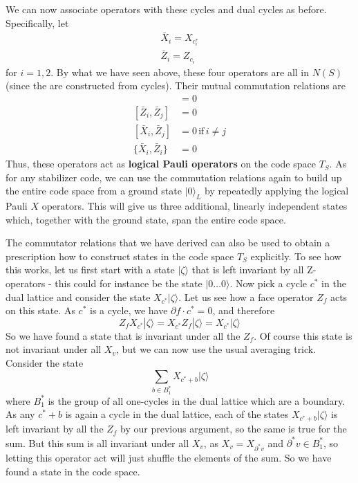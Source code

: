 \documentclass[a4paper, draft]{article}
\theoremstyle{own}
\theoremstyle{remark}
\begin{document}
We can now associate operators with these cycles and dual cycles as before. Specifically, let
\begin{align*}
\bar{X}_i = X_{c^*_i} \\
\bar{Z}_i = Z_{c_i} 
\end{align*}
for $i = 1,2$. By what we have seen above, these four operators are all in $N(S)$ (since the are constructed from cycles). Their mutual commutation relations are
\begin{align*}
[\bar{X}_i, \bar{X}_j] &= 0 \\
[\bar{Z}_i, \bar{Z}_j] &= 0 \\
[\bar{X}_i, \bar{Z}_j] &= 0 \, \text{if} \, i \neq j  \\
\{ \bar{X}_i, \bar{Z}_i \} &= 0 
\end{align*}
Thus, these operators act as {\bf logical Pauli operators} on the code space $T_S$. As for any stabilizer code, we can use the commutation relations again to build up the entire code space from a ground state $|0 \rangle_L$ by repeatedly applying the logical Pauli $X$ operators. This will give us three additional, linearly independent states which, together with the ground state, span the entire code space. 

The commutator relations that we have derived can also be used to obtain a prescription how to construct states in the code space $T_S$ explicitly. To see how this works, let us first start with a state $|\zeta \rangle$ that is left invariant by all Z-operators - this could for instance be the state $| 0 \dots 0 \rangle$. Now pick a cycle $c^*$ in the dual lattice and consider the state $X_{c^*} |\zeta \rangle$. Let us see how a face operator $Z_f$ acts on this state. As $c^*$ is a cycle, we have $\partial f \cdot c^* = 0$, and therefore
$$
Z_f X_{c^*} |\zeta \rangle = X_{c^*} Z_f |\zeta \rangle = X_{c^*} |\zeta \rangle
$$
So we have found a state that is invariant under all the $Z_f$. Of course this state is not invariant under all $X_v$, but we can now use the usual averaging trick. Consider the state
$$
\sum_{b \in B_1^*} X_{c^* + b} |\zeta \rangle
$$
where $B_1^*$ is the group of all one-cycles in the dual lattice which are a boundary. As any $c^* + b$ is again a cycle in the dual lattice, each of the states $X_{c^* + b} |\zeta \rangle$ is left invariant by all the $Z_f$ by our previous argument, so the same is true for the sum. But this sum is all invariant under all $X_v$, as $X_v = X_{\partial^* v}$ and $\partial^*v \in B_1^*$, so letting this operator act will just shuffle the elements of the sum. So we have found a state in the code space. 
\end{document}
